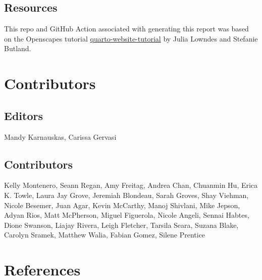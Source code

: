\documentclass[
  letterpaper,
  oneside,
  open=any]{scrbook}
\begin{document}
\section{Resources}\label{resources}

This repo and GitHub Action associated with generating this report was
based on the Openscapes tutorial
\href{https://github.com/Openscapes/quarto-website-tutorial}{quarto-website-tutorial}
by Julia Lowndes and Stefanie Butland.


\chapter{Contributors}\label{contributors}

\section{\texorpdfstring{\textbf{Editors}}{Editors}}\label{editors}

Mandy Karnauskas, Carissa Gervasi

\section{\texorpdfstring{\textbf{Contributors}}{Contributors}}\label{contributors-1}

Kelly Montenero, Seann Regan, Amy Freitag, Andrea Chan, Chuanmin Hu,
Erica K. Towle, Laura Jay Grove, Jeremiah Blondeau, Sarah Groves, Shay
Viehman, Nicole Besemer, Juan Agar, Kevin McCarthy, Manoj Shivlani, Mike
Jepson, Adyan Rios, Matt McPherson, Miguel Figuerola, Nicole Angeli,
Sennai Habtes, Dione Swanson, Liajay Rivera, Leigh Fletcher, Tarsila
Seara, Suzana Blake, Carolyn Sramek, Matthew Walia, Fabian Gomez, Silene
Prentice


\chapter*{References}\label{references}

\end{document}
